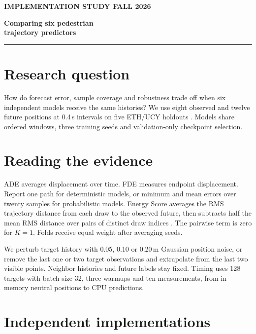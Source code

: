 \documentclass[10pt]{article}
\begin{document}
\color{Ink}
{\sffamily\bfseries\color{Teal}\small IMPLEMENTATION STUDY \hfill FALL 2026\par}
\vspace{0.4em}
{\sffamily\bfseries\LARGE Comparing six pedestrian\\trajectory predictors\par}
{\sffamily\small\color{Muted}\SubmissionStatus\par}
\vspace{0.45em}
{\color{Rule}\hrule}
\vspace{0.4em}

\section{Research question}
How do forecast error, sample coverage and robustness trade off when six
independent models receive the same histories? We use eight observed and
twelve future positions at 0.4\,s intervals on five ETH/UCY holdouts
\cite{pellegrini2009,lerner2007}. Models share ordered windows, three
training seeds and validation-only checkpoint selection.

\section{Reading the evidence}
ADE averages displacement over time. FDE measures endpoint displacement.
Report one path for deterministic models, or minimum and mean errors over
twenty samples for probabilistic models. Energy Score averages the RMS
trajectory distance from each draw to the observed future, then subtracts
half the mean RMS distance over pairs of distinct draw indices
\cite{gneiting2007}. The pairwise term is zero for \(K=1\).
Folds receive equal weight after averaging seeds.

We perturb target history with 0.05, 0.10 or 0.20\,m Gaussian position noise,
or remove the last one or two target observations and extrapolate from the
last two visible points. Neighbor histories and future labels stay fixed.
Timing uses 128 targets with batch size 32, three warmups and ten
measurements, from in-memory neutral positions to CPU predictions.

\section{Independent implementations}

\end{document}
